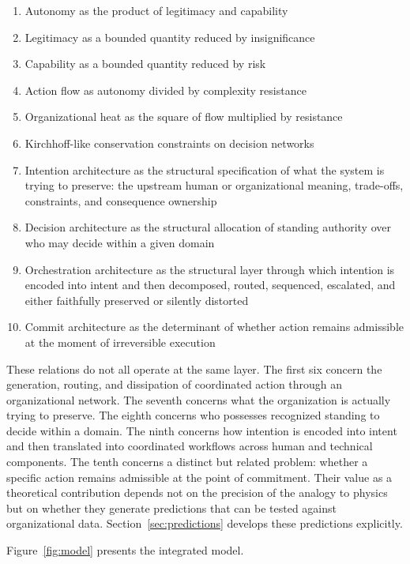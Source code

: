 \documentclass[12pt]{article}
\begin{document}
\begin{enumerate}
  \item Autonomy as the product of legitimacy and capability
  \item Legitimacy as a bounded quantity reduced by insignificance
  \item Capability as a bounded quantity reduced by risk
  \item Action flow as autonomy divided by complexity resistance
  \item Organizational heat as the square of flow multiplied by resistance
  \item Kirchhoff-like conservation constraints on decision networks
  \item Intention architecture as the structural specification of what the
    system is trying to preserve: the upstream human or organizational meaning,
    trade-offs, constraints, and consequence ownership
  \item Decision architecture as the structural allocation of standing authority
    over who may decide within a given domain
  \item Orchestration architecture as the structural layer through which
    intention is encoded into intent and then decomposed, routed, sequenced,
    escalated, and either faithfully preserved or silently distorted
  \item Commit architecture as the determinant of whether action remains
    admissible at the moment of irreversible execution
\end{enumerate}

These relations do not all operate at the same layer. The first six concern
the generation, routing, and dissipation of coordinated action through an
organizational network. The seventh concerns what the organization is actually
trying to preserve. The eighth concerns who possesses recognized standing to
decide within a domain. The ninth concerns how intention is encoded into intent
and then translated into coordinated workflows across human and technical
components. The tenth concerns a distinct but related problem: whether a
specific action remains admissible at the point of commitment. Their value as
a theoretical contribution depends not on the precision of the analogy to
physics but on whether they generate predictions that can be tested against
organizational data. Section~\ref{sec:predictions} develops these predictions
explicitly.

Figure~\ref{fig:model} presents the integrated model.
\end{document}
